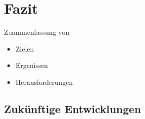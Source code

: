\section{Fazit}

Zuammenfassung von

\begin{itemize}[noitemsep]
    \item Zielen
    \item Ergenissen
    \item Herausforderungen
 \end{itemize}
 
\subsection{Zukünftige Entwicklungen}
